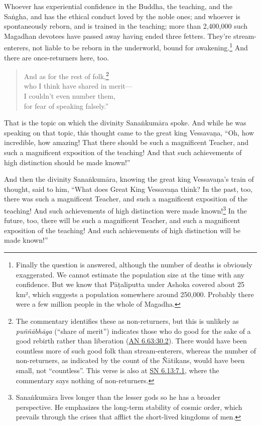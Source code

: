 \documentclass[12pt,openany]{book}%
\begin{document}
Whoever has experiential confidence in the Buddha, the teaching, and the \textsanskrit{Saṅgha}, and has the ethical conduct loved by the noble ones; and whoever is spontaneously reborn, and is trained in the teaching; more than 2,400,000 such Magadhan devotees have passed away having ended three fetters. They’re stream-enterers, not liable to be reborn in the underworld, bound for awakening.\footnote{Finally the question is answered, although the number of deaths is obviously exaggerated. We cannot estimate the population size at the time with any confidence. But we know that \textsanskrit{Pāṭaliputta} under Ashoka covered about 25 km², which suggests a population somewhere around 250,000. Probably there were a few million people in the whole of Magadha. } And there are once-returners here, too. 

\begin{verse}%
And as for the rest of folk,\footnote{The commentary identifies these as non-returners, but this is unlikely as \textit{\textsanskrit{puññābhāga}} (“share of merit”) indicates those who do good for the sake of a good rebirth rather than liberation (\href{https://suttacentral.net/an6.63/en/sujato\#30.2}{AN 6.63:30.2}). There would have been countless more of such good folk than stream-enterers, whereas the number of non-returners, as indicated by the count of the \textsanskrit{Ñātikans}, would have been small, not “countless”. This verse is also at \href{https://suttacentral.net/sn6.13/en/sujato\#7.1}{SN 6.13:7.1}, where the commentary says nothing of non-returners. } \\
who I think have shared in merit—\\
I couldn’t even number them, \\
for fear of speaking falsely.” 

%
\end{verse}

That is the topic on which the divinity \textsanskrit{Sanaṅkumāra} spoke. And while he was speaking on that topic, this thought came to the great king \textsanskrit{Vessavaṇa}, “Oh, how incredible, how amazing! That there should be such a magnificent Teacher, and such a magnificent exposition of the teaching! And that such achievements of high distinction should be made known!” 

And then the divinity \textsanskrit{Sanaṅkumāra}, knowing the great king \textsanskrit{Vessavaṇa}’s train of thought, said to him, “What does Great King \textsanskrit{Vessavaṇa} think? In the past, too, there was such a magnificent Teacher, and such a magnificent exposition of the teaching! And such achievements of high distinction were made known!\footnote{\textsanskrit{Sanaṅkumāra} lives longer than the lesser gods so he has a broader perspective. He emphasizes the long-term stability of cosmic order, which prevails through the crises that afflict the short-lived kingdoms of men. } In the future, too, there will be such a magnificent Teacher, and such a magnificent exposition of the teaching! And such achievements of high distinction will be made known!” 
\end{document}
